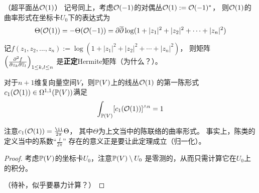 
\begin{example}（超平面丛$\mathcal{O}(1)$）
记号同上，考虑$\mathcal{O}(-1)$的对偶丛$\mathcal{O}(1):=\mathcal{O}(-1)^*$，
则$\mathcal{O}(1)$的曲率形式在坐标卡$U_0$下的表达式为
$$
  \Theta(\mathcal{O}(1))=-\Theta(\mathcal{O}(-1))
=
  \partial\overline{\partial}\log(1+|z_1|^2+|z_2|^2+\cdots+|z_n|^2)
$$
\end{example}

{\color{blue}
记$f(z_1,z_2,...,z_n):=\log(1+|z_1|^2+|z_2|^2+\cdots+|z_n|^2)$，
则矩阵$\left(\frac{\partial^2{f}} {\partial{z_k}\partial{\overline{z}_l}}\right)_{1\leq k,l\leq n}$
是\textbf{正定}Hermite矩阵（为什么？）。
}


\begin{thm}
对于$n+1$维复向量空间$V$，则$\mathbb{P}(V)$上的线丛$\mathcal{O}(1)$
的第一陈形式$c_1(\mathcal{O}(1))\in\Omega^{1,1}(\mathbb{P}(V))$满足
$$
  \int_{\mathbb{P}(V)}
    [c_1(\mathcal{O}(1))]^{\wedge n}
=1
$$
\end{thm}


注意$c_1(\mcalO(1))=\frac{\ii}{2\pi}\Theta$，
其中$\Theta$为上文当中的陈联络的曲率形式。
事实上，陈类的定义当中的系数“$\frac{\ii}{2\pi}$”
存在的意义正是要让此定理成立（归一化）。

\begin{proof}
考虑$\mathbb{P}(V)$的坐标卡$U_0$，注意$\mathbb{P}(V)\setminus U_0$
是零测的，从而只需计算它在$U_0$上的积分。

{\color{red}（待补，似乎要暴力计算？）}
\end{proof}






